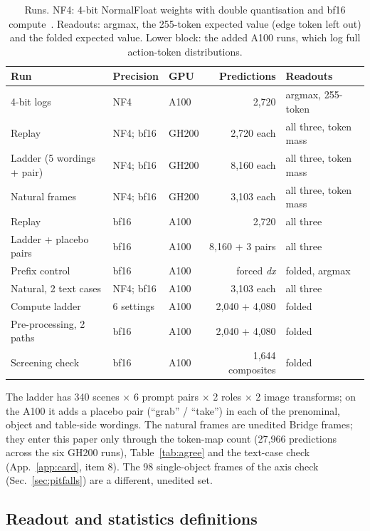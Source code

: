 \documentclass[conference]{IEEEtran}
\newcommand{\dx}{\textit{dx}}
\begin{document}
\begin{table}[h]
\centering
\scriptsize
\setlength{\tabcolsep}{1.6pt}
\caption{Runs. NF4: 4-bit NormalFloat weights with double quantisation and bf16 compute~\cite{dettmers2023qlora}. Readouts: argmax, the 255-token expected value (edge token left out) and the folded expected value. Lower block: the added A100 runs, which log full action-token distributions.}
\label{tab:runs}
\begin{tabular}{@{}l l l r l@{}}
\toprule
Run & Precision & GPU & Predictions & Readouts\\
\midrule
4-bit logs & NF4 & A100 & 2,720 & argmax, 255-token\\
Replay & NF4; bf16 & GH200 & 2,720 each & all three, token mass\\
Ladder (5 wordings + pair) & NF4; bf16 & GH200 & 8,160 each & all three, token mass\\
Natural frames & NF4; bf16 & GH200 & 3,103 each & all three, token mass\\
\midrule
Replay & bf16 & A100 & 2,720 & all three\\
Ladder + placebo pairs & bf16 & A100 & 8,160 + 3 pairs & all three\\
Prefix control & bf16 & A100 & forced \dx & folded, argmax\\
Natural, 2 text cases & NF4; bf16 & A100 & 3,103 each & all three\\
Compute ladder & 6 settings & A100 & 2,040 + 4,080 & folded\\
Pre-processing, 2 paths & bf16 & A100 & 2,040 + 4,080 & folded\\
Screening check & bf16 & A100 & 1,644 composites & folded\\
\bottomrule
\end{tabular}
\end{table}

\noindent The ladder has 340 scenes $\times$ 6 prompt pairs $\times$ 2 roles $\times$ 2 image transforms; on the A100 it adds a placebo pair (``grab'' / ``take'') in each of the prenominal, object and table-side wordings. The natural frames are unedited Bridge frames; they enter this paper only through the token-map count (27,966 predictions across the six GH200 runs), Table~\ref{tab:agree} and the text-case check (App.~\ref{app:card}, item 8). The 98 single-object frames of the axis check (Sec.~\ref{sec:pitfalls}) are a different, unedited set.

\subsection{Readout and statistics definitions}
\label{app:defs}
\end{document}
